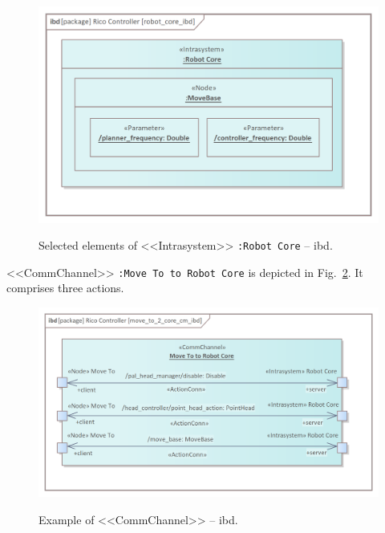 \begin{figure}[H]
    \centering
    \begin{center}
    {\includegraphics[scale=0.85]{../imgs/rico_pkg/robot_core_ibd.png}}
    \end{center}
    \caption{Selected elements of <<Intrasystem>> \texttt{:Robot Core} -- ibd.}
    \label{fig:robot_core_ibd}
\end{figure}


<<CommChannel>> \texttt{:Move To to Robot Core} is depicted in Fig.~\ref{fig:move_to_2_core_cm_ibd}. It comprises three actions.


\begin{figure}[H]
    \centering
    \begin{center}
    {\includegraphics[scale=1.0]{../imgs/rico_pkg/move_to_2_core_cm_ibd.png}}
    \end{center}
    \caption{Example of <<CommChannel>> -- ibd.}
    \label{fig:move_to_2_core_cm_ibd}
\end{figure}


